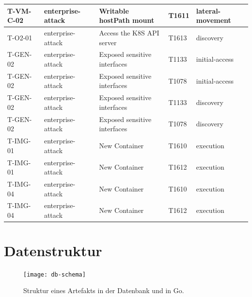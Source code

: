 \begin{longtable}{|l|l|l|l|l|}
    T-VM-C-02 & enterprise-attack & Writable hostPath mount & T1611 & lateral-movement \\ \hline
    T-O2-01 & enterprise-attack & Access the K8S API server & T1613 & discovery \\ \hline
    T-GEN-02 & enterprise-attack & Exposed sensitive interfaces & T1133 & initial-access \\ \hline
    T-GEN-02 & enterprise-attack & Exposed sensitive interfaces & T1078 & initial-access \\ \hline
    T-GEN-02 & enterprise-attack & Exposed sensitive interfaces & T1133 & discovery \\ \hline
    T-GEN-02 & enterprise-attack & Exposed sensitive interfaces & T1078 & discovery \\ \hline
    T-IMG-01 & enterprise-attack & New Container & T1610 & execution \\ \hline
    T-IMG-01 & enterprise-attack & New Container & T1612 & execution \\ \hline
    T-IMG-04 & enterprise-attack & New Container & T1610 & execution \\ \hline
    T-IMG-04 & enterprise-attack & New Container & T1612 & execution \\ \hline
\end{longtable}
\restoregeometry

\chapter{Datenstruktur}
\label{app:db-schema}

\begin{figure}[H]
    \centering
    \texttt{[image: db-schema]}
    \caption{Struktur eines Artefakts in der Datenbank und in Go.}
\end{figure}

